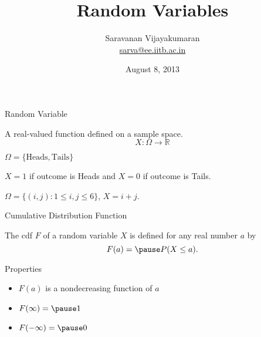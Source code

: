 \documentclass[t]{beamer}
\title[EE 703 DMT]{Random Variables}
\author[Saravanan V]
{
  Saravanan Vijayakumaran\\
  \href{mailto:sarva@ee.iitb.ac.in}{sarva@ee.iitb.ac.in}
}
\institute[IIT Bombay]
{
  Department of Electrical Engineering\\
  Indian Institute of Technology Bombay
}
\date{August 8, 2013}
\begin{document}
\begin{frame}
  \titlepage
\end{frame}

\begin{frame}{Random Variable}
  \footnotesize
  \pause
  \begin{definition}
    A real-valued function defined on a sample space.
      \begin{equation*}
        X : \Omega \rightarrow \mathbb{R}
      \end{equation*}
  \end{definition}
  \pause
  \begin{example}
    $\Omega = \{\text{Heads}, \text{Tails}\}$ \pause

    $X = 1$ if outcome is Heads and $X=0$ if outcome is Tails.
  \end{example}
  \pause
  \begin{example}
    $\Omega = \{(i,j):1\leq i,j \leq 6\}$, $X = i+j$.
  \end{example}
  \normalsize
\end{frame}

\begin{frame}{Cumulative Distribution Function}
  \footnotesize
  \pause
  \begin{definition}
  The cdf $F$ of a random variable $X$ is defined for any real number $a$ by
    \begin{equation*}
      F(a) = \pause P(X \leq a).
    \end{equation*}
  \end{definition}
  \pause
  \begin{block}{Properties}
    \begin{itemize}
      \item $F(a)$ is a nondecreasing function of $a$
      \pause
      \item $F(\infty) = \pause 1$
      \pause
      \item $F(-\infty) =\pause  0$
    \end{itemize}
  \end{block}
  \normalsize
\end{frame}
\end{document}

